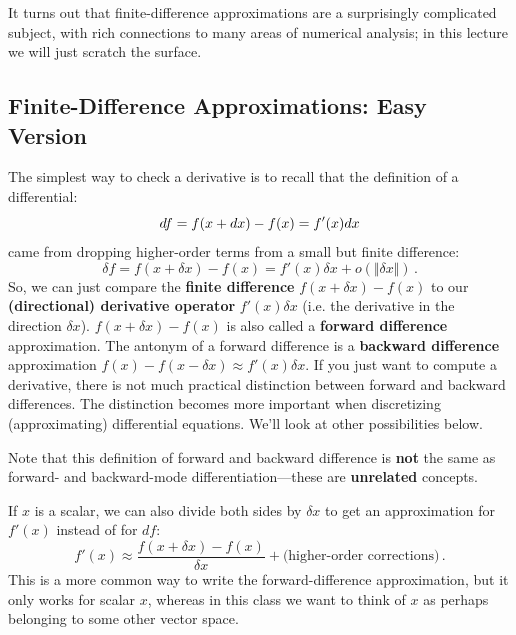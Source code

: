 It turns out that finite-difference approximations are a surprisingly complicated subject, with rich connections to many areas of numerical analysis; in this lecture we will just scratch the surface.

\subsection{Finite-Difference Approximations: Easy Version}

The simplest way to check a derivative is to recall that the definition of a differential:
\begin{displaymath}
	d f = f(x+d x) - f(x) = f'(x) d x
\end{displaymath}
came from dropping higher-order terms from a small but finite difference:
\begin{displaymath}
	\delta f = f(x+\delta x) - f(x) = f'(x) \delta x + o(\Vert \delta x \Vert) \, .
\end{displaymath}
So, we can just compare the \textbf{finite difference} $\boxed{f(x+\delta x) - f(x)}$ to our \textbf{(directional) derivative operator} $f'(x) \delta x$ (i.e. the derivative in the direction $\delta x$). $f(x+\delta x) - f(x)$ is also called a \textbf{forward difference} approximation.  The antonym of a forward difference is a \textbf{backward difference} approximation $f(x) - f(x - \delta x) \approx f'(x) \delta x$. If you just want to compute a derivative, there is not much practical distinction between forward and backward differences.  The distinction becomes more important when discretizing (approximating) differential equations. We'll look at other possibilities below.

\begin{remark}
Note that this definition of forward and backward difference is \textbf{not} the same as forward- and backward-mode differentiation---these are \textbf{unrelated} concepts.
\end{remark}

If $x$ is a scalar, we can also divide both sides by $\delta x$ to get an approximation for $f'(x)$ instead of for $df$:
\begin{displaymath}
	f'(x) \approx \frac{f(x+\delta x) - f(x)}{\delta x} + \text{(higher-order corrections)} \, .
\end{displaymath}
This is a more common way to write the forward-difference approximation, but it only works for scalar $x$, whereas in this class we want to think of $x$ as perhaps belonging to some other vector space. 

